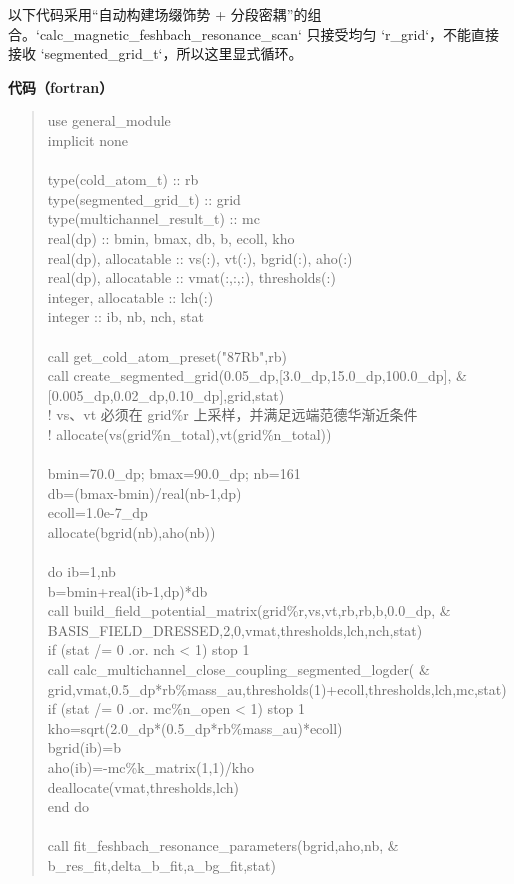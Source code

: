 \documentclass[UTF8,openany,11pt,fontset=fandol]{ctexbook}
\begin{document}
以下代码采用``自动构建场缀饰势 +
分段密耦''的组合。`calc\_magnetic\_feshbach\_resonance\_scan` 只接受均匀
`r\_grid`，不能直接接收 `segmented\_grid\_t`，所以这里显式循环。

\textbf{代码（fortran）}

\begin{quote}
use general\_module\\
implicit none\\
~\\
type(cold\_atom\_t) :: rb\\
type(segmented\_grid\_t) :: grid\\
type(multichannel\_result\_t) :: mc\\
real(dp) :: bmin, bmax, db, b, ecoll, kho\\
real(dp), allocatable :: vs(:), vt(:), bgrid(:), aho(:)\\
real(dp), allocatable :: vmat(:,:,:), thresholds(:)\\
integer, allocatable :: lch(:)\\
integer :: ib, nb, nch, stat\\
~\\
call get\_cold\_atom\_preset("87Rb",rb)\\
call create\_segmented\_grid(0.05\_dp,{[}3.0\_dp,15.0\_dp,100.0\_dp{]},
\&\\
{[}0.005\_dp,0.02\_dp,0.10\_dp{]},grid,stat)\\
! vs、vt 必须在 grid\%r 上采样，并满足远端范德华渐近条件\\
! allocate(vs(grid\%n\_total),vt(grid\%n\_total))\\
~\\
bmin=70.0\_dp; bmax=90.0\_dp; nb=161\\
db=(bmax-bmin)/real(nb-1,dp)\\
ecoll=1.0e-7\_dp\\
allocate(bgrid(nb),aho(nb))\\
~\\
do ib=1,nb\\
b=bmin+real(ib-1,dp)*db\\
call build\_field\_potential\_matrix(grid\%r,vs,vt,rb,rb,b,0.0\_dp, \&\\
BASIS\_FIELD\_DRESSED,2,0,vmat,thresholds,lch,nch,stat)\\
if (stat /= 0 .or. nch \textless{} 1) stop 1\\
call calc\_multichannel\_close\_coupling\_segmented\_logder( \&\\
grid,vmat,0.5\_dp*rb\%mass\_au,thresholds(1)+ecoll,thresholds,lch,mc,stat)\\
if (stat /= 0 .or. mc\%n\_open \textless{} 1) stop 1\\
kho=sqrt(2.0\_dp*(0.5\_dp*rb\%mass\_au)*ecoll)\\
bgrid(ib)=b\\
aho(ib)=-mc\%k\_matrix(1,1)/kho\\
deallocate(vmat,thresholds,lch)\\
end do\\
~\\
call fit\_feshbach\_resonance\_parameters(bgrid,aho,nb, \&\\
b\_res\_fit,delta\_b\_fit,a\_bg\_fit,stat)
\end{quote}
\end{document}
